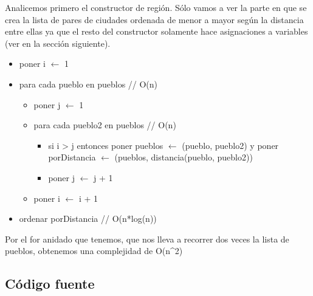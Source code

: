 Analicemos primero el constructor de regi\'on. S\'olo vamos a ver la parte en que se crea la lista de pares de ciudades ordenada de menor a mayor seg\'un la distancia entre ellas ya que el resto del constructor solamente hace asignaciones a variables (ver en la secci\'on siguiente).
\begin{itemize}
\item poner i $\leftarrow$ 1
\item para cada pueblo en pueblos  \/// O(n) 
\begin{itemize}
	\item poner j $\leftarrow$ 1
	\item para cada pueblo2 en pueblos \/// O(n)
	\begin{itemize}
		\item si i > j entonces poner pueblos $\leftarrow$ (pueblo, pueblo2) y poner porDistancia $\leftarrow$ (pueblos, distancia(pueblo, pueblo2))
		\item poner j $\leftarrow$ j + 1
	\end{itemize}
	\item poner i $\leftarrow$ i + 1
\end{itemize}
\item ordenar porDistancia \/// O(n*log(n)) 
\end{itemize}

Por el for anidado que tenemos, que nos lleva a recorrer dos veces la lista de pueblos, obtenemos una complejidad de O(n^2)

\subsection{C\'odigo fuente}

